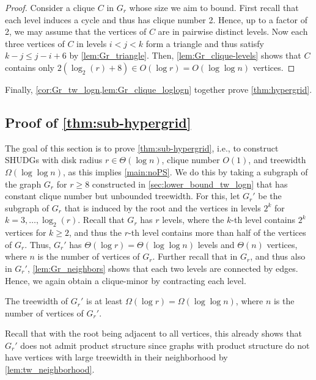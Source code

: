 %
\begin{proof}
    Consider a clique $ C $ in $ G_r $ whose size we aim to bound.
    First recall that each level induces a cycle and thus has clique number 2.
    Hence, up to a factor of 2, we may assume that the vertices of $ C $ are in pairwise distinct levels.
    Now each three vertices of $ C $ in levels $ i < j < k $ form a triangle and thus satisfy $ k - j \leq j - i + 6 $ by \cref{lem:Gr_triangle}.
    Then, \cref{lem:Gr_clique-levels} shows that $ C $ contains only $ 2 (\log_2(r) + 8) \in O(\log r) = O(\log \log n) $ vertices. 
\end{proof}
%
Finally, \cref{cor:Gr_tw_logn,lem:Gr_clique_loglogn} together prove \cref{thm:hypergrid}.
%
%
%
\subsection{Proof of \texorpdfstring{\cref{thm:sub-hypergrid}}{Theorem 9}}
\label{sec:lower_bound_tw_loglogn}
%
The goal of this section is to prove \cref{thm:sub-hypergrid}, i.e., to construct SHUDGs with disk radius $ r \in \Theta(\log n) $, clique number $ O(1) $, and treewidth $ \Omega(\log \log n) $, as this implies \cref{main:noPS}.
We do this by taking a subgraph of the graph $ G_r $ for $ r \geq 8 $ constructed in \cref{sec:lower_bound_tw_logn} that has constant clique number but unbounded treewidth.
For this, let $ G_r' $ be the subgraph of $ G_r $ that is induced by the root and the vertices in levels $ 2^k $ for $ k = 3, \dots, \log_2(r) $.
Recall that $ G_r $ has $ r $ levels, where the $ k $-th level contains $ 2^k $ vertices for $ k \geq 2 $, and thus the $ r $-th level contains more than half of the vertices of $ G_r $.
Thus, $ G_r' $ has $ \Theta(\log r) = \Theta( \log \log n ) $ levels and $ \Theta(n) $ vertices, where $ n $ is the number of vertices of $ G_r $.
Further recall that in $ G_r $, and thus also in $ G_r' $, \cref{lem:Gr_neighbors} shows that each two levels are connected by edges.
Hence, we again obtain a clique-minor by contracting each level.
%
\begin{lemma}\label{lem:Gr'_tw_loglogn}
    The treewidth of $ G_r' $ is at least $ \Omega(\log r) = \Omega(\log \log n) $, where $ n $ is the number of vertices of $ G_r' $.
\end{lemma}
%
Recall that with the root being adjacent to all vertices, this already shows that $ G_r' $ does not admit product structure since graphs with product structure do not have vertices with large treewidth in their neighborhood by \cref{lem:tw_neighborhood}.
